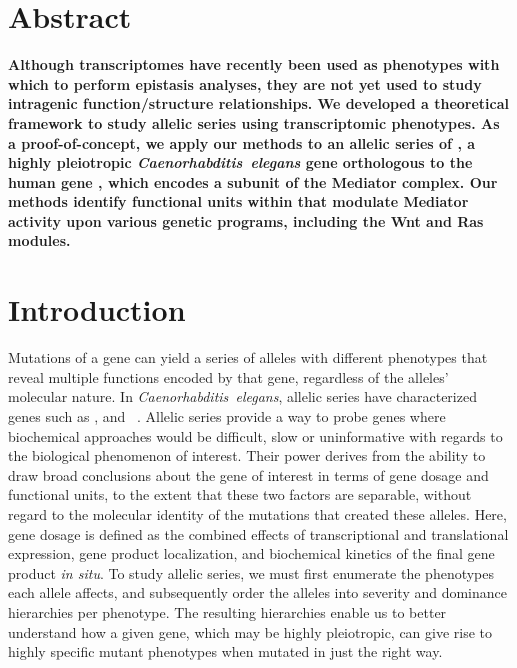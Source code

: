 \newcommand{\gf}{gain-of-function allele}
\newcommand{\lf}{loss-of-function allele}
\newcommand{\strong}{strong loss-of-function allele}
\newcommand{\weak}{weak loss-of-function allele}

\newcommand{\ras}{\gene{let-60} (\emph{ras})}
\newcommand{\rasp}{\protein{let-60}}
\newcommand{\dpy}[1]{\gene{dpy-22#1}}
\newcommand{\letgfn}{3,021}
\newcommand{\letlfn}{857}
\newcommand{\letgf}{\gene{let-60(gf)}}
\newcommand{\letlf}{\gene{let-60(lf)}}
\newcommand{\strongn}{2,036}
\newcommand{\weakn}{266}
\newcommand{\transn}{2,128}
\newcommand{\bx}{\dpy{(bx93)}}
\newcommand{\sy}{\dpy{(sy622)}}

\newcommand{\ra}[1]{\renewcommand{\arraystretch}{#1}}

\section*{Abstract}
  \textbf{Although transcriptomes have recently been used as phenotypes with
  which to perform epistasis analyses, they are not yet used to study intragenic
  function/structure relationships. We developed a theoretical framework to
  study allelic series using transcriptomic phenotypes. As a proof-of-concept,
  we apply our methods to an allelic series of \dpy{}, a highly pleiotropic
  \emph{Caenorhabditis~elegans} gene orthologous to the human gene ,
  which encodes a subunit of the Mediator complex. Our methods identify
  functional units within \dpy{} that modulate Mediator activity upon various
  genetic programs, including the Wnt and Ras modules.}

\section*{Introduction}
Mutations of a gene can yield a series of alleles with different phenotypes that
reveal multiple functions encoded by that gene, regardless of the alleles'
molecular nature. In \emph{Caenorhabditis~elegans}, allelic series have
characterized genes such as ,  and
~\citep{Aroian1991, Ferguson1985a, Greenwald1983}. Allelic
series provide a way to probe genes where biochemical approaches would be
difficult, slow or uninformative with regards to the biological phenomenon of
interest. Their power derives from the ability to draw broad conclusions about
the gene of interest in terms of gene dosage and functional units, to the extent
that these two factors are separable, without regard to the molecular identity
of the mutations that created these alleles. Here, gene dosage is defined as the
combined effects of transcriptional and translational expression, gene product
localization, and biochemical kinetics of the final gene product \emph{in situ}.
To study allelic series, we must first enumerate the phenotypes each allele
affects, and subsequently order the alleles into severity and dominance
hierarchies per phenotype. The resulting hierarchies enable us to better
understand how a given gene, which may be highly pleiotropic, can give rise to
highly specific mutant phenotypes when mutated in just the right way.

